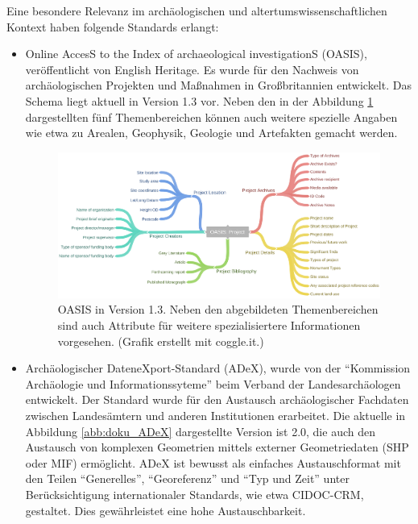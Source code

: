 Eine besondere Relevanz im archäologischen und altertumswissenschaftlichen Kontext haben folgende Standards erlangt:
\begin{itemize}
	\item Online AccesS to the Index of archaeological investigationS (OASIS), veröffentlicht von English Heritage. Es wurde für den Nachweis von archäologischen Projekten und Maßnahmen in Großbritannien entwickelt. Das Schema liegt aktuell in Version 1.3 vor. Neben den in der Abbildung \ref{abb:doku_oasisProject} dargestellten fünf Themenbereichen können auch weitere spezielle Angaben wie etwa zu Arealen, Geophysik, Geologie und Artefakten gemacht werden.
	\begin{figure}[h!bt]
		\begin{center}
			\includegraphics[width=\textwidth]{bilder/doku_oasisProject}
		\end{center}
		\caption{OASIS in Version 1.3. Neben den abgebildeten Themenbereichen sind auch Attribute für weitere spezialisiertere Informationen vorgesehen. (Grafik erstellt mit coggle.it.)}
		\label{abb:doku_oasisProject}
\end{figure}
	\item Archäologischer DateneXport-Standard (ADeX), wurde von der "`Kommission Archäologie und Informationssyteme"' beim Verband der Landesarchäologen entwickelt. Der Standard wurde für den Austausch archäologischer Fachdaten zwischen Landesämtern und anderen Institutionen erarbeitet. Die aktuelle in Abbildung \ref{abb:doku_ADeX} dargestellte Version ist 2.0, die auch den Austausch von komplexen Geometrien mittels externer Geometriedaten (SHP oder MIF) ermöglicht. ADeX ist bewusst als einfaches Austauschformat mit den Teilen "`Generelles"', "`Georeferenz"' und  "`Typ und Zeit"' unter Berücksichtigung internationaler Standards, wie etwa CIDOC-CRM, gestaltet. Dies gewährleistet eine hohe Austauschbarkeit.
	\begin{figure}[h!bt]
		\begin{center}

\end{center}
\end{figure}
\end{itemize}
